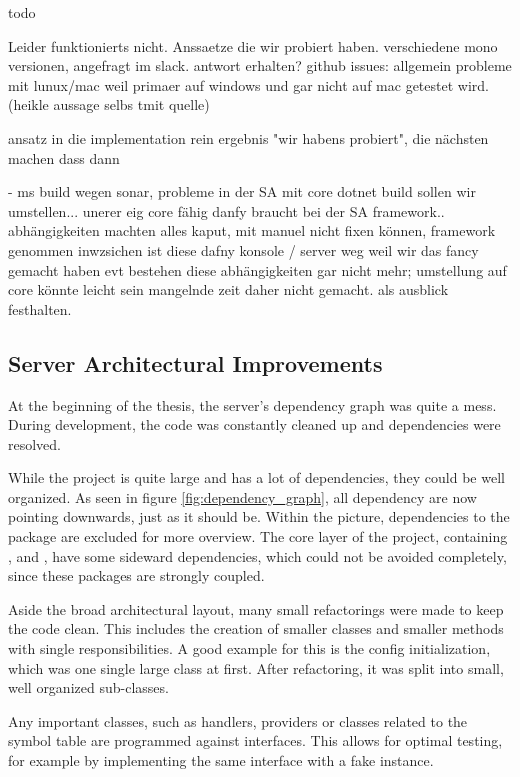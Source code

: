todo

Leider funktionierts nicht.
Anssaetze die wir probiert haben. verschiedene mono versionen, angefragt im slack. antwort erhalten?
github issues: allgemein probleme mit lunux/mac weil primaer auf windows und gar nicht auf mac getestet wird. (heikle aussage selbs tmit quelle)

ansatz in die implementation rein
ergebnis "wir habens probiert", die nächsten machen dass dann

- ms build wegen sonar, probleme in der SA mit core
dotnet build sollen wir umstellen...
unerer eig core fähig
danfy braucht bei der SA framework.. abhängigkeiten machten alles kaput, mit manuel nicht fixen können, framework genommen
inwzsichen ist diese dafny konsole / server weg weil wir das fancy gemacht haben
evt bestehen diese abhängigkeiten gar nicht mehr; umstellung auf core könnte leicht sein
mangelnde zeit daher nicht gemacht. als ausblick festhalten.

\cite{sa}
\cite{mono-slack}
\cite{mono-git}


\subsection{Server Architectural Improvements}
At the beginning of the thesis, the server's dependency graph was quite a mess.
During development, the code was constantly cleaned up and dependencies were resolved.

While the project is quite large and has a lot of dependencies, they could be well organized.
As seen in figure \ref{fig:dependency_graph}, all dependency are now pointing downwards, just as it should be.
Within the picture, dependencies to the  package are excluded for more overview.
The core layer of the project, containing ,  and , have some sideward dependencies, which could not be avoided completely, since these packages are strongly coupled.

Aside the broad architectural layout, many small refactorings were made to keep the code clean.
This includes the creation of smaller classes and smaller methods with single responsibilities.
A good example for this is the config initialization, which was one single large class at first.
After refactoring, it was split into small, well organized sub-classes.

Any important classes, such as handlers, providers or classes related to the symbol table are programmed against interfaces.
This allows for optimal testing, for example by implementing the same interface with a fake instance.

